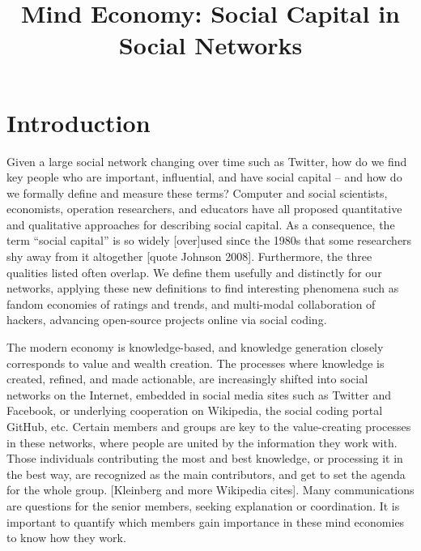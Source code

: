 
\title{Mind Economy: Social Capital in Social Networks}




\section{Introduction}

	Given a large social network changing over time such as Twitter, how do we find key people who are important, influential, and have social capital -- and how do we formally define and measure these terms?  Computer and social scientists, economists, operation researchers, and educators have all proposed quantitative and qualitative approaches for describing social capital.  As a consequence, the term “social capital” is so widely [over]used sinсe the 1980s that some researchers shy away from it altogether [quote Johnson 2008].  Furthermore, the three qualities listed often overlap.  We define them usefully and distinctly for our networks, applying these new definitions to find interesting phenomena such as fandom economies of ratings and trends, and multi-modal collaboration of hackers, advancing open-source projects online via social coding.

	The modern economy is knowledge-based, and knowledge generation closely corresponds to value and wealth creation.  The processes where knowledge is created, refined, and made actionable, are increasingly shifted into social networks on the Internet, embedded in social media sites such as Twitter and Facebook, or underlying cooperation on Wikipedia, the social coding portal GitHub, etc. Certain members and groups are key to the value-creating processes in these networks, where people are united by the information they work with.  Those individuals contributing the most and best knowledge, or processing it in the best way, are recognized as the main contributors, and get to set the agenda for the whole group. [Kleinberg and more Wikipedia cites].  Many communications are questions for the senior members, seeking explanation or coordination.  It is important to quantify which members gain importance in these mind economies to know how they work.
	
